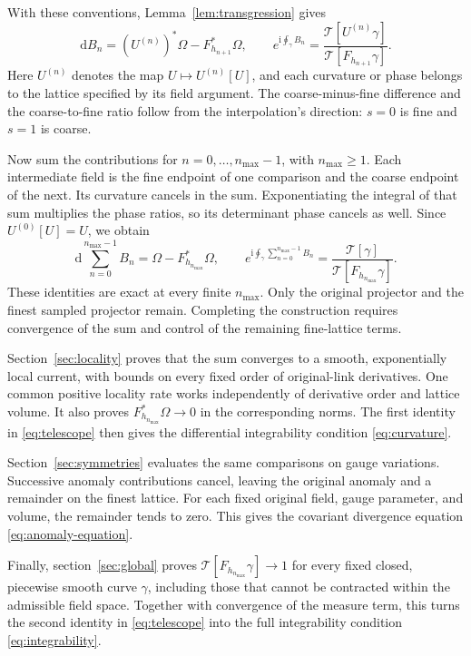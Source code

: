 \documentclass[11pt,a4paper]{article}
\theoremstyle{remark}
\newcommand{\dd}{\mathrm d}
\newcommand{\ii}{\mathrm i}
\begin{document}
With these conventions, Lemma~\ref{lem:transgression} gives
\begin{equation}
 \dd B_n=(U^{(n)})^*\Omega-F_{h_{n+1}}^*\Omega,
 \qquad
 e^{\ii\oint_\gamma B_n}
  =\frac{\mathcal T[U^{(n)}\gamma]}
         {\mathcal T[F_{h_{n+1}}\gamma]}.
 \label{eq:level-telescope}
\end{equation}
Here $U^{(n)}$ denotes the map $U\mapsto U^{(n)}[U]$, and each curvature
or phase belongs to the lattice specified by its field argument. The
coarse-minus-fine difference and the coarse-to-fine ratio follow from
the interpolation's direction: $s=0$ is fine and $s=1$ is coarse.

Now sum the contributions for $n=0,\ldots,n_{\max}-1$, with
$n_{\max}\ge1$. Each intermediate field is the fine endpoint of one
comparison and the coarse endpoint of the next. Its curvature cancels
in the sum. Exponentiating the integral of that sum multiplies the phase
ratios, so its determinant phase cancels as well. Since $U^{(0)}[U]=U$,
we obtain
\begin{equation}
 \dd\sum_{n=0}^{n_{\max}-1}B_n=\Omega-F_{h_{n_{\max}}}^*\Omega,
 \qquad
 e^{\ii\oint_\gamma\sum_{n=0}^{n_{\max}-1}B_n}
       =\frac{\mathcal T[\gamma]}{\mathcal T[F_{h_{n_{\max}}}\gamma]}.
 \label{eq:telescope}
\end{equation}
These identities are exact at every finite $n_{\max}$. Only the original
projector and the finest sampled projector remain. Completing the
construction requires convergence of the sum and control of the remaining
fine-lattice terms.

Section~\ref{sec:locality} proves that the sum converges to a smooth,
exponentially local current, with bounds on every fixed order of
original-link derivatives. One common positive locality rate works
independently of derivative order and lattice volume. It also proves
$F_{h_{n_{\max}}}^*\Omega\to0$ in the corresponding norms. The first
identity in \eqref{eq:telescope} then gives the differential integrability
condition \eqref{eq:curvature}.

Section~\ref{sec:symmetries} evaluates the same comparisons on gauge
variations. Successive anomaly contributions cancel, leaving the original
anomaly and a remainder on the finest lattice. For each fixed original
field, gauge parameter, and volume, the remainder tends to zero. This
gives the covariant divergence equation \eqref{eq:anomaly-equation}.

Finally, section~\ref{sec:global} proves
$\mathcal T[F_{h_{n_{\max}}}\gamma]\to1$ for every fixed closed,
piecewise smooth curve $\gamma$, including those that cannot be contracted
within the admissible field space. Together with convergence of the
measure term, this turns the second identity in \eqref{eq:telescope}
into the full integrability condition \eqref{eq:integrability}.
\end{document}
